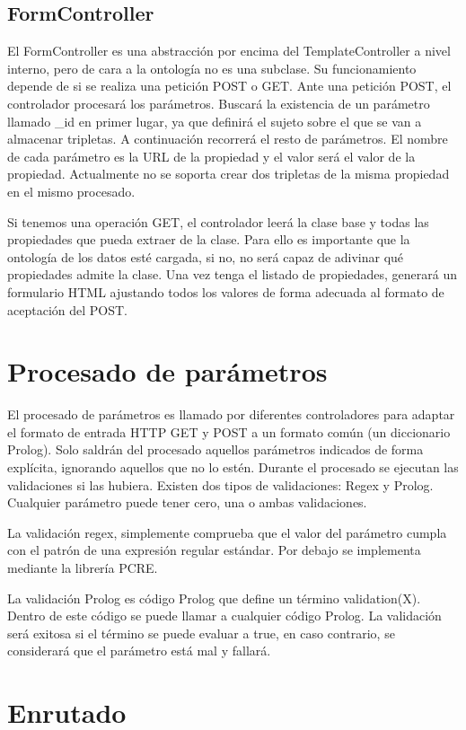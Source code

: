\documentclass[12pt]{report} %
\begin{document}
\subsection{FormController}
El FormController es una abstracción por encima del TemplateController a nivel interno, pero de cara a la ontología no es una subclase.
Su funcionamiento depende de si se realiza una petición POST o GET. Ante una petición POST, el controlador procesará los parámetros.
Buscará la existencia de un parámetro llamado \_id en primer lugar, ya que definirá el sujeto sobre el que se van a almacenar tripletas.
A continuación recorrerá el resto de parámetros. El nombre de cada parámetro es la URL de la propiedad y el valor será el valor de la propiedad.
Actualmente no se soporta crear dos tripletas de la misma propiedad en el mismo procesado.

Si tenemos una operación GET, el controlador leerá la clase base y todas las propiedades que pueda extraer de la clase. Para ello es importante que la ontología de los datos esté cargada, si no, no será capaz de adivinar qué propiedades admite la clase.
Una vez tenga el listado de propiedades, generará un formulario HTML ajustando todos los valores de forma adecuada al formato de aceptación del POST.

\section{Procesado de parámetros}
El procesado de parámetros es llamado por diferentes controladores para adaptar el formato de entrada HTTP GET y POST a un formato común (un diccionario Prolog).
Solo saldrán del procesado aquellos parámetros indicados de forma explícita, ignorando aquellos que no lo estén.
Durante el procesado se ejecutan las validaciones si las hubiera. Existen dos tipos de validaciones: Regex y Prolog.
Cualquier parámetro puede tener cero, una o ambas validaciones.

La validación regex, simplemente comprueba que el valor del parámetro cumpla con el patrón de una expresión regular estándar. Por debajo se implementa mediante la librería PCRE.

La validación Prolog es código Prolog que define un término validation(X). Dentro de este código se puede llamar a cualquier código Prolog.
La validación será exitosa si el término se puede evaluar a true, en caso contrario, se considerará que el parámetro está mal y fallará.

\section{Enrutado}
\end{document}
